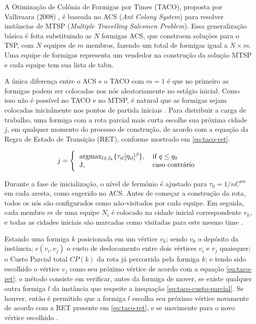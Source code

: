 A Otimização de Colônia de Formigas por Times (TACO), proposta por Vallivaara (2008) \cite{vallivaara2008team}, é baseada no ACS (\textit{Ant Colony System}) para resolver instâncias de MTSP (\textit{Multiple Travelling Salesmen Problem}). Essa generalização básica é feita substituindo as $N$ formigas ACS, que constroem soluções para o TSP, com $N$ equipes de $m$ membros, fazendo um total de formigas igual a $N \times m$. Uma equipe de formigas representa um vendedor na construção da solução MTSP e cada equipe tem sua lista de tabu.

A única diferença entre o ACS e o TACO com $m = 1$ é que no primeiro as formigas podem ser colocadas nos nós aleatoriamente no estágio inicial. Como isso não é possível no TACO e no MTSP, é natural que as formigas sejam colocadas inicialmente nos pontos de partida iniciais \cite{vallivaara2008team}. Para distribuir a carga de trabalho, uma formiga com a rota parcial mais curta escolhe sua próxima cidade $j$, em qualquer momento do processo de construção, de acordo com a equação da Regra de Estado de Transição (RET), conforme mostrado em \ref{eq:taco-ret}.

\begin{equation} \label{eq:taco-ret} 
    j = \Bigg\{
        \begin{tabular}{ll}
        argmax\(_{l \in J_k} \{\tau_{il}[\eta_{il}]^\beta\}\), & if $q \leq q_0$ \\
        J, & caso contrário
        \end{tabular}
\end{equation}

Durante a fase de inicialização, o nível de fermônio é ajustado para $\tau_0 = 1 / nC^{nn}$ em cada aresta, como sugerido no ACS. Antes de começar a construção da rota, todos os nós são configurados como não-visitados por cada equipe. Em seguida, cada membro $m$ de uma equipe $N_i$ é colocado na cidade inicial correspondente $v_k$, e todas as cidades iniciais são marcadas como visitadas para este mesmo time \cite{vallivaara2008team}.

Estando uma formiga $k$ posicionada em um vértice $v_k$; sendo $v_0$ o depósito da instância; $c(v_i, v_j)$ o
custo de deslocamento entre dois vértices $v_i$ e $v_j$ quaisquer; o Custo Parcial total $CP(k)$ da rota já percorrida pela formiga $k$; e tendo sido escolhido o vértice $v_j$ como seu próximo vértice de acordo com a equação \ref{eq:taco-ret}; o método consiste em verificar, antes da formiga de mover, se existe qualquer outra formiga $l$ da instância que respeite a inequação \ref{eq:taco-custo-parcial}. Se houver, então é permitido que a formiga $l$ escolha seu próximo vértice novamente de acordo com a RET presente em \ref{eq:taco-ret}, e se movimente para o novo vértice escolhido \cite{vallivaara2008team}.

